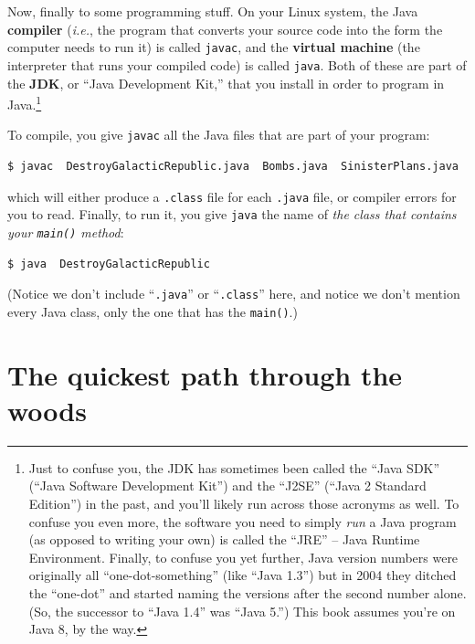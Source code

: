\begin{enumerate}
Now, finally to some programming stuff. On your Linux system, the Java
\textbf{compiler} (\textit{i.e.}, the program that converts your source code
into the form the computer needs to run it) is called \texttt{javac}, and the
\textbf{virtual machine} (the interpreter that runs your compiled code) is
called \texttt{java}. Both of these are part of the \textbf{JDK}, or ``Java
Development Kit,'' that you install in order to program in Java.\footnote{Just
to confuse you, the JDK has sometimes been called the ``Java SDK'' (``Java
Software Development Kit'') and the ``J2SE'' (``Java 2 Standard Edition'') in
the past, and you'll likely run across those acronyms as well. To confuse you
even more, the software you need to simply \textit{run} a Java program (as
opposed to writing your own) is called the ``JRE'' -- Java Runtime
Environment. Finally, to confuse you yet further, Java version numbers were
originally all ``one-dot-something'' (like ``Java 1.3'') but in 2004 they
ditched the ``one-dot'' and started naming the versions after the second
number alone. (So, the successor to ``Java 1.4'' was ``Java 5.'') This book
assumes you're on Java 8, by the way.}


To compile, you give \texttt{javac} all the Java files that are part of your
program:

\begin{Verbatim}[fontsize=\small]
$ javac  DestroyGalacticRepublic.java  Bombs.java  SinisterPlans.java
\end{Verbatim}

which will either produce a \texttt{.class} file for each \texttt{.java} file,
or compiler errors for you to read. Finally, to run it, you give \texttt{java}
the name of \textit{the class that contains your \texttt{main()} method}:

\begin{Verbatim}[fontsize=\small]
$ java  DestroyGalacticRepublic
\end{Verbatim}

(Notice we don't include ``\texttt{.java}'' or ``\texttt{.class}'' here, and
notice we don't mention every Java class, only the one that has the
\texttt{main()}.)

\end{enumerate}

\section{The quickest path through the woods}

